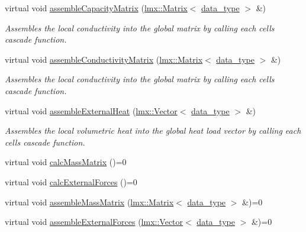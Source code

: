 \begin{DoxyCompactItemize}
virtual void \hyperlink{classmknix_1_1_body_a073f28930ce01dbf40244625538326ce}{assemble\+Capacity\+Matrix} (\hyperlink{classlmx_1_1_matrix}{lmx\+::\+Matrix}$<$ \hyperlink{namespacemknix_a16be4b246fbf2cceb141e3a179111020}{data\+\_\+type} $>$ \&)
\begin{DoxyCompactList}\small\item\em Assembles the local conductivity into the global matrix by calling each cell\textquotesingle{}s cascade function. \end{DoxyCompactList}\item 
virtual void \hyperlink{classmknix_1_1_body_a7185066ed04c51946b256412ee92c00c}{assemble\+Conductivity\+Matrix} (\hyperlink{classlmx_1_1_matrix}{lmx\+::\+Matrix}$<$ \hyperlink{namespacemknix_a16be4b246fbf2cceb141e3a179111020}{data\+\_\+type} $>$ \&)
\begin{DoxyCompactList}\small\item\em Assembles the local conductivity into the global matrix by calling each cell\textquotesingle{}s cascade function. \end{DoxyCompactList}\item 
virtual void \hyperlink{classmknix_1_1_body_a7b8c3fab4eaa4ecba277317fa7bfb0f3}{assemble\+External\+Heat} (\hyperlink{classlmx_1_1_vector}{lmx\+::\+Vector}$<$ \hyperlink{namespacemknix_a16be4b246fbf2cceb141e3a179111020}{data\+\_\+type} $>$ \&)
\begin{DoxyCompactList}\small\item\em Assembles the local volumetric heat into the global heat load vector by calling each cell\textquotesingle{}s cascade function. \end{DoxyCompactList}\item 
virtual void \hyperlink{classmknix_1_1_body_ad34fa07c6620c9fcc2268bfdbfd42194}{calc\+Mass\+Matrix} ()=0
\item 
virtual void \hyperlink{classmknix_1_1_body_a71d21e817523058098bcec62fb377187}{calc\+External\+Forces} ()=0
\item 
virtual void \hyperlink{classmknix_1_1_body_acd6c47f4e0a25e927141cb325df896a9}{assemble\+Mass\+Matrix} (\hyperlink{classlmx_1_1_matrix}{lmx\+::\+Matrix}$<$ \hyperlink{namespacemknix_a16be4b246fbf2cceb141e3a179111020}{data\+\_\+type} $>$ \&)=0
\item 
virtual void \hyperlink{classmknix_1_1_body_a46a17ef341d6ea217e1548108a4e9efc}{assemble\+External\+Forces} (\hyperlink{classlmx_1_1_vector}{lmx\+::\+Vector}$<$ \hyperlink{namespacemknix_a16be4b246fbf2cceb141e3a179111020}{data\+\_\+type} $>$ \&)=0

\end{DoxyCompactItemize}
